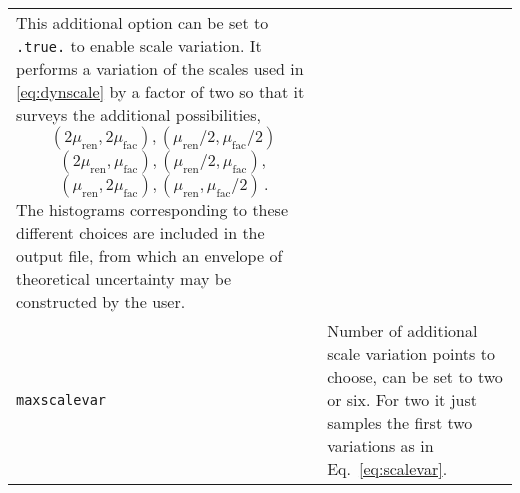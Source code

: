\begin{longtable}{p{1.5cm}p{12cm}}
		This additional option can be set to \texttt{.true.} to enable scale variation.
		It performs a variation of the scales used in \ref{eq:dynscale} by a factor of 
		two so that it surveys the 
		additional possibilities,
	       \begin{equation*}
	       (2\mu_{\mathrm{ren}},2\mu_{\mathrm{fac}}),
	       (\mu_{\mathrm{ren}}/2,\mu_{\mathrm{fac}}/2)
	       \end{equation*}
	       \begin{equation}
	       (2\mu_{\mathrm{ren}},\mu_{\mathrm{fac}}),
	       (\mu_{\mathrm{ren}}/2,\mu_{\mathrm{fac}}),
	       \label{eq:scalevar}
	       \end{equation}
	       \begin{equation*}
	       (\mu_{\mathrm{ren}},2\mu_{\mathrm{fac}}),
	       (\mu_{\mathrm{ren}},\mu_{\mathrm{fac}}/2) \,.
	       \end{equation*}
		The histograms corresponding to these different choices are included in the output file, from which an
		envelope of theoretical uncertainty may be constructed by the user. \\
		\texttt{maxscalevar} &
		Number of additional scale variation points to choose, can be set to two or six. For two
		it just samples the first two variations as in Eq.~\ref{eq:scalevar}. \\
		\hline
	\end{longtable}
